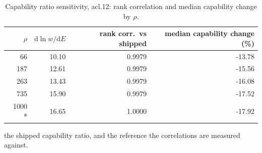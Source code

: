 \begin{table}[htbp]
  \centering
  \caption{Capability ratio sensitivity, acl.12: rank correlation and median capability change by $\rho$.}
  \label{tab:rho-acl-12-summary}
  \begin{tabular}{r r r r}
    \toprule
    $\rho$ & $\mathrm{d}\ln w/\mathrm{d}E$ & rank corr.\ vs shipped & median capability change (\%) \\
    \midrule
    66 & 10.10 & 0.9979 & -13.78 \\
    187 & 12.61 & 0.9979 & -15.56 \\
    263 & 13.43 & 0.9979 & -16.08 \\
    735 & 15.90 & 0.9979 & -17.52 \\
    1000 * & 16.65 & 1.0000 & -17.92 \\
    \bottomrule
  \end{tabular}
  \par\smallskip\footnotesize * the shipped capability ratio, and the reference the correlations are measured against.
\end{table}
